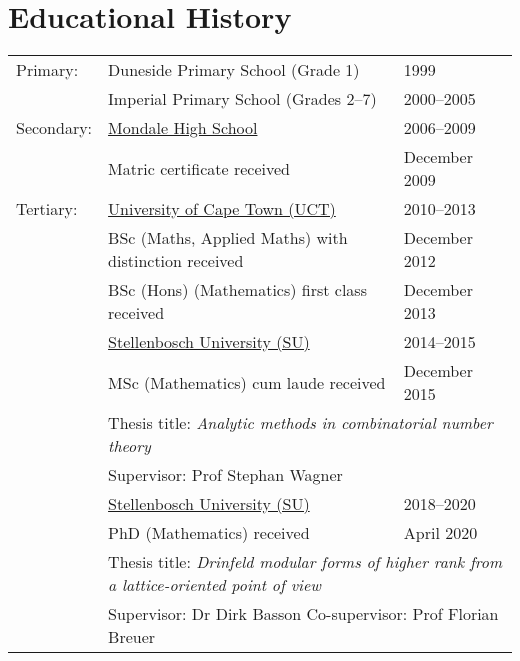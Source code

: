 \documentclass{article}
\begin{document}
\section{Educational History}
\renewcommand{\t}{\hspace{0.4cm}}
\begin{center} \begin{tabular}{lp{}l}
\toprule
Primary:
& Duneside Primary School (Grade 1)														& 1999 \\
\cmidrule{2-3}
& Imperial Primary School (Grades 2--7)												& 2000--2005 \\
\midrule

Secondary:
& \href{http://www.mondalehs.co.za/}{Mondale High School}			& 2006--2009 \\
& \t Matric certificate received								 							& \t December 2009 \\
\midrule

Tertiary:
& \href{http://www.uct.ac.za/}{University of Cape Town (UCT)} & 2010--2013 \\
& \t BSc (Maths, Applied Maths) with distinction received			& \t December 2012 \\
& \t BSc (Hons) (Mathematics) first class received 						& \t December 2013 \\
\cmidrule{2-3}
& \href{http://www.sun.ac.za/}{Stellenbosch University (SU)}	& 2014--2015 \\
& \t MSc (Mathematics) cum laude received								 			& \t December 2015 \\
& \multicolumn{2}{l}{\t \t \small{Thesis title: \textit{Analytic methods in combinatorial number theory}}} \\
& \t \t \small{Supervisor: Prof Stephan Wagner} \\
\cmidrule{2-3}
& \href{http://www.sun.ac.za/}{Stellenbosch University (SU)}	& 2018--2020 \\
& \t PhD (Mathematics) received 															& \t April 2020 \\
& \multicolumn{2}{l}{\t \t \small{Thesis title: \textit{Drinfeld modular forms of higher rank from a lattice-oriented point of view}}} \\
& \multicolumn{2}{l}{\t \t \small{Supervisor: Dr Dirk Basson} \t \small{Co-supervisor: Prof Florian Breuer}} \\
\bottomrule
\end{tabular} \end{center}


\clearpage
\end{document}
